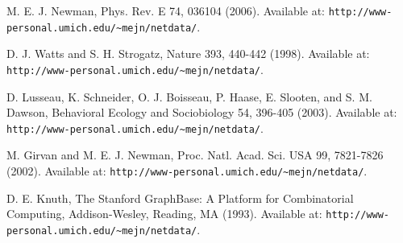 \documentclass{llncs}
\begin{document}
%

%
%
\begin{thebibliography}{}
%
%
%
%
%

M. E. J. Newman, Phys. Rev. E 74, 036104 (2006). Available at: \texttt{http://www-personal.umich.edu/\~{}mejn/netdata/}.

D. J. Watts and S. H. Strogatz, Nature 393, 440-442 (1998). Available at: \texttt{http://www-personal.umich.edu/\~{}mejn/netdata/}.

D. Lusseau, K. Schneider, O. J. Boisseau, P. Haase, E. Slooten, and S. M. Dawson, Behavioral Ecology and Sociobiology 54, 396-405 (2003). Available at: \texttt{http://www-personal.umich.edu/\~{}mejn/netdata/}.

M. Girvan and M. E. J. Newman, Proc. Natl. Acad. Sci. USA 99, 7821-7826 (2002). Available at: \texttt{http://www-personal.umich.edu/\~{}mejn/netdata/}.

D. E. Knuth, The Stanford GraphBase: A Platform for Combinatorial Computing, Addison-Wesley, Reading, MA (1993). Available at: \texttt{http://www-personal.umich.edu/\~{}mejn/netdata/}.


\end{thebibliography}
\end{document}
